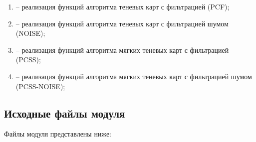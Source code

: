 \begin{itemize}[label=---]
\begin{enumerate}[label=\arabic*), labelsep=0.5em]
        \item {} -- реализация функций алгоритма теневых карт с фильтрацией (PCF);
        \item {} -- реализация функций алгоритма теневых карт с фильтрацией шумом (NOISE);
        \item {} -- реализация функций алгоритма мягких теневых карт с фильтрацией (PCSS);
        \item {} -- реализация функций алгоритма мягких теневых карт с фильтрацией шумом (PCSS-NOISE);
    \end{enumerate}
\end{itemize}

\subsection{Исходные файлы модуля }

Файлы модуля представлены ниже:

